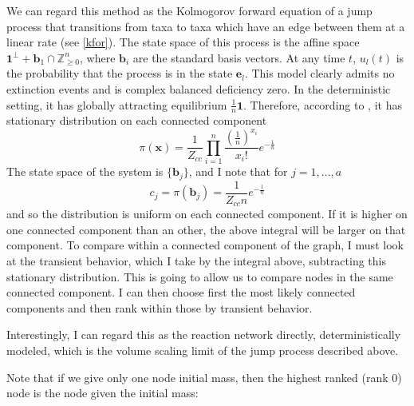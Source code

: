 \documentclass[10pt]{article}
\theoremstyle{definition}
\numberwithin{theorem}{section}
\numberwithin{definition}{section}
\numberwithin{lemma}{section}
\numberwithin{corollary}{section}
\numberwithin{clm}{section}
\numberwithin{rmk}{section}
\renewcommand{\b}{\bm}
\newcommand{\bZ}{\mathbb{Z}}
\begin{document}
We can regard this method as the Kolmogorov forward equation of a jump process that transitions from taxa to taxa which have an edge between them at a linear rate (see \cref{kfor}). The state space of this process is the affine space $\b{1}^{\perp} + \b{b}_1\cap \bZ^n_{\geq 0}$, where $\b{b}_i$ are the standard basis vectors. At any time $t$, $u_l(t)$ is the probability that the process is in the state $\b{e}_l$. This model clearly admits no extinction events and is complex balanced deficiency zero. In the deterministic setting, it has globally attracting equilibrium $\frac{1}{n}\b{1}$. Therefore, according to \cite{Anderson2010}, it has stationary distribution on each connected component
\[
\pi(\b{x}) = \frac{1}{Z_{cc}} \prod_{i=1}^n \frac{\left(\frac{1}{n}\right)^{x_i}}{x_i!}e^{-\frac{1}{n}}
\]
The state space of the system is $\{\b{b}_j\}$, and I note that for $j = 1,...,a$
\[
c_j = \pi(\b{b}_j) = \frac{1}{Z_{cc} n}e^{-\frac{1}{n}}
\]
and so the distribution is uniform on each connected component. If it is higher on one connected  component than an other, the above integral will be larger on that component. To compare within a connected component of the graph, I must look at the transient behavior, which I take by the integral above, subtracting this stationary distribution. This is going to allow us to compare nodes in the same connected component. I can then choose first the most likely connected components and then rank within those by transient behavior. 

Interestingly, I can regard this as the reaction network directly, deterministically modeled, which is the volume scaling limit of the jump process described above.

Note that if we give only one node initial mass, then the highest ranked (rank $0$) node is the node given the initial mass:
\end{document}
